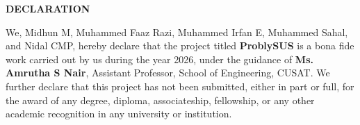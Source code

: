 \clearpage
{}
{}
\thispagestyle{footeronly}
\begin{center}
{\Large \textbf{DECLARATION}}
\end{center}

\justifying
\noindent
We, Midhun M, Muhammed Faaz Razi, Muhammed Irfan E, Muhammed Sahal, and Nidal CMP,
hereby declare that the project titled \textbf{ProblySUS} is a bona fide work carried out by us
during the year 2026, under the guidance of \textbf{Ms. Amrutha S Nair}, Assistant Professor,
School of Engineering, CUSAT. We further declare that this project has not been submitted,
either in part or full, for the award of any degree, diploma, associateship, fellowship, or any
other academic recognition in any university or institution.

\vfill

\clearpage